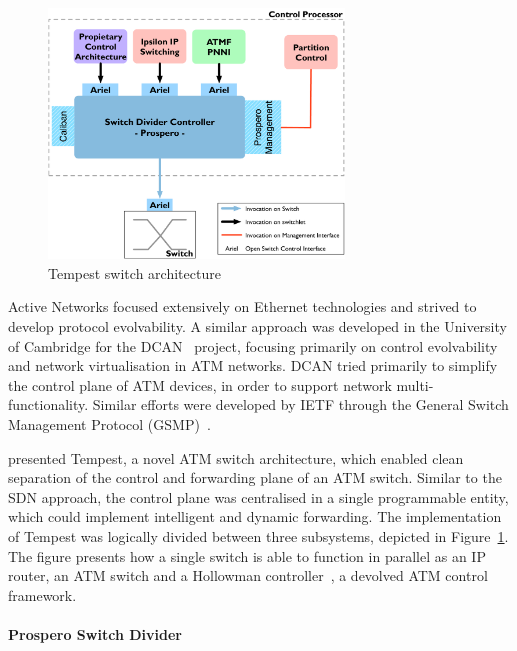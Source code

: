 \begin{figure}
  \begin{center}
\includegraphics[width=0.7\textwidth]{Background/BackgroundFigs/tempest_arch}
\caption{Tempest switch architecture~}
\label{fig:background:tempest_arch}
\end{center}
\end{figure}

Active Networks focused extensively on Ethernet technologies and strived to
develop protocol evolvability. A similar approach was developed in the
University of Cambridge for the DCAN~ project, focusing
primarily on control evolvability and network virtualisation in ATM networks.
DCAN tried primarily to simplify the control plane of ATM devices, in order to
support network multi-functionality. Similar efforts were developed by IETF
through the General Switch Management Protocol (GSMP)~.

 presented Tempest, a novel ATM switch architecture, which
enabled clean separation of the control and forwarding plane of an ATM
switch. Similar to the SDN approach,  the control plane was centralised in a
single programmable entity, which could implement intelligent and dynamic
forwarding.  The implementation of Tempest was logically divided between three
subsystems, depicted in Figure~\ref{fig:background:tempest_arch}. The figure
presents how a single switch is able to function in parallel as an IP router, an
ATM switch and a Hollowman controller~, a devolved ATM
control framework. 

\paragraph{Prospero Switch Divider} 

